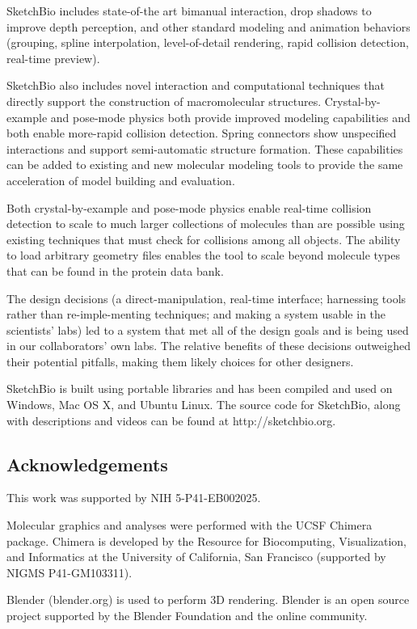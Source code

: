 \documentclass[twocolumn]{bmcart}%
\begin{document}
SketchBio includes state-of-the art bimanual interaction, drop shadows to improve depth perception, and other standard modeling and animation behaviors (grouping, spline interpolation, level-of-detail rendering, rapid collision detection, real-time preview).

SketchBio also includes novel interaction and computational techniques that directly support the construction of macromolecular structures.
Crystal-by-example and pose-mode physics both provide improved modeling capabilities and both enable more-rapid collision detection.
Spring connectors show unspecified interactions and support semi-automatic structure formation.
These capabilities can be added to existing and new molecular modeling tools to provide the same acceleration of model building and evaluation.

Both crystal-by-example and pose-mode physics enable real-time collision detection to scale to much larger collections of molecules than are possible using existing techniques that must check for collisions among all objects. The ability to load arbitrary geometry files enables the tool to scale beyond molecule types that can be found in the protein data bank.

The design decisions (a direct-manipulation, real-time interface; harnessing tools rather than re-imple-menting techniques; and making a system usable in the scientists' labs) led to a system that met all of the design goals and is being used in our collaborators' own labs.
The relative benefits of these decisions outweighed their potential pitfalls, making them likely choices for other designers.

SketchBio is built using portable libraries and has been compiled and used on Windows, Mac OS X, and Ubuntu Linux.
The source code for SketchBio, along with descriptions and videos can be found at http://sketchbio.org.

\subsection*{Acknowledgements}
This work was supported by NIH 5-P41-EB002025.

Molecular graphics and analyses were performed with the UCSF Chimera package.
Chimera is developed by the Resource for Biocomputing, Visualization, and Informatics at the University of California, San Francisco (supported by NIGMS P41-GM103311).

Blender (blender.org) is used to perform 3D rendering.
Blender is an open source project supported by the Blender Foundation and the online community.
\end{document}
